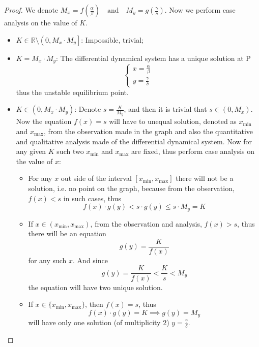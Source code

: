 \documentclass{article}
\begin{document}
\begin{proof}
We denote $\displaystyle{M_x=f(\frac{\alpha}{\beta})\mathrm{\quad and\quad}M_y=g(\frac{\gamma}{\delta})}$. Now we perform case analysis on the value of $K$.
\begin{itemize}
\item $K\in\mathbb{R}\setminus\left(0,M_x\cdot M_y\right
]$: Impossible, trivial;
\item $K=M_x\cdot M_y$: The differential dynamical system has a unique solution at P
$$
\begin{cases}
x=\frac{\alpha}{\beta}\\
y=\frac{\gamma}{\delta}
\end{cases}
$$
thus the unstable equilibrium point.
\item $K\in\left(0,M_x\cdot M_y\right)$:
Denote $s=\displaystyle{\frac{K}{M_y}}$, and then it is trivial that $s\in(0,M_x)$. Now the equation $f(x)=s$ will have to unequal solution, denoted as $x_{\min}$ and $x_{\max}$, from the observation made in the graph and also the quantitative and qualitative analysis made of the differential dynamical system. Now for any given $K$ such two $x_{\min}$ and $x_{\max}$ are fixed, thus perform case analysis on the value of $x$:
\begin{itemize}
\item
For any $x$ out side of the interval $[x_{\min},x_{\max}]$ there will not be a solution, i.e. no point on the graph, because from the observation, $f(x)<s$ in such cases, thus
$$
f(x)\cdot g(y)<s\cdot g(y)\leq s\cdot M_y=K
$$
\item
If $\displaystyle{x\in\left(x_{\min},x_{\max}\right)}$, from the observation and analysis, $f(x)>s$, thus there will be an equation
$$
g(y)=\frac{K}{f(x)}
$$
for any such $x$. And since
$$
g(y)=\frac{K}{f(x)}<\frac{K}{s}<M_y
$$
the equation will have two unique solution.
\item
If $x\in\{x_{\min},x_{\max}\}$, then $f(x)=s$, thus
$$
f(x)\cdot g(y)=K\implies g(y)=M_y
$$
will have only one solution (of multiplicity $2$) $y=\displaystyle{\frac{\gamma}{\delta}}$.
\end{itemize}
\end{itemize}


\end{proof}
\end{document}
